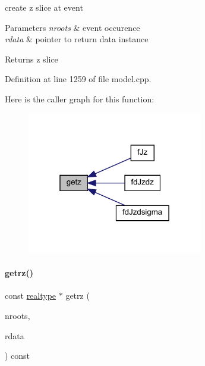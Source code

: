 create z slice at event 
\begin{DoxyParams}{Parameters}
{\em nroots} & event occurence \\
\hline
{\em rdata} & pointer to return data instance \\
\hline
\end{DoxyParams}
\begin{DoxyReturn}{Returns}
z slice 
\end{DoxyReturn}


Definition at line 1259 of file model.\+cpp.

Here is the caller graph for this function\+:
\nopagebreak
\begin{figure}[H]
\begin{center}
\leavevmode
\includegraphics[width=217pt]{classamici_1_1_model_a30571e418f94ca61b8df2b355e46ee1a_icgraph}
\end{center}
\end{figure}
\mbox{\label{classamici_1_1_model_ab2a9be3bb641741a52ddc48fcd9aa143}} 
\paragraph{\texorpdfstring{getrz()}{getrz()}}
{\footnotesize\ttfamily const \mbox{\hyperlink{namespaceamici_a1bdce28051d6a53868f7ccbf5f2c14a3}{realtype}} $\ast$ getrz (\begin{DoxyParamCaption}\item[{const int}]{nroots,  }\item[{const \mbox{\hyperlink{classamici_1_1_return_data}{Return\+Data}} $\ast$}]{rdata }\end{DoxyParamCaption}) const\hspace{0.3cm}{\ttfamily [protected]}}

